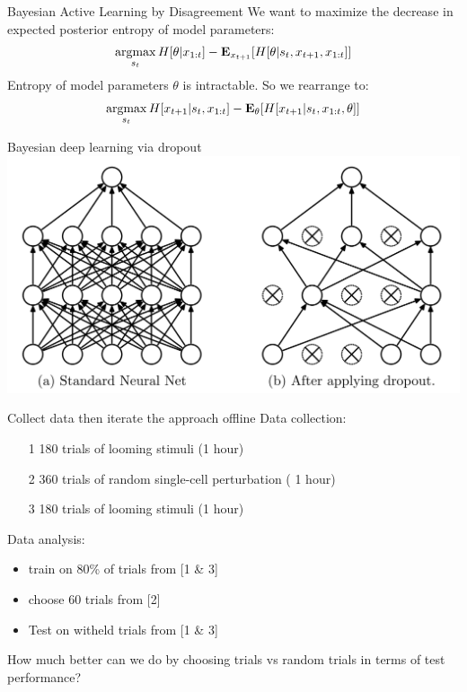 \begin{frame}{Bayesian Active Learning by Disagreement}
    We want to maximize the decrease in expected posterior entropy of model parameters:
    \begin{align}
        \operatorname*{argmax}_{s_t} H[\theta|x_{1:t}] - \mathbf{E}_{x_{t+1}}[H[\theta|s_t,x_{t+1},x_{1:t}]]
    \end{align}
    Entropy of model parameters $\theta$ is intractable. So we rearrange to:
    \begin{align}
        \operatorname*{argmax}_{s_t} H[x_{t+1}|s_t,x_{1:t}] - \mathbf{E}_{\theta}[H[x_{t+1}|s_t,x_{1:t},\theta]]
    \end{align}
\end{frame}

\begin{frame}{Bayesian deep learning via dropout}
    \includegraphics[width=\textwidth]{media/dropout}
\end{frame}{}

\begin{frame}{ Collect data then iterate the approach offline }
    Data collection:
    \begin{itemize}
        \item [1] 180 trials of looming stimuli (1 hour)
        \item [2] 360 trials of random single-cell perturbation ( 1 hour)
        \item [3] 180 trials of looming stimuli (1 hour)
    \end{itemize}{}
    Data analysis:
    \begin{itemize}
        \item train on 80\% of trials from [1 \& 3]
        \item choose 60 trials from [2]
        \item Test on witheld trials from [1 \& 3]
    \end{itemize}{}
    How much better can we do by choosing trials vs random trials in terms of test performance?
\end{frame}{}

